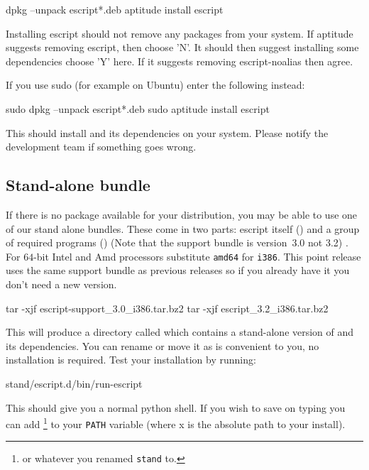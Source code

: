 \begin{shellCode}
dpkg --unpack escript*.deb
aptitude install escript
\end{shellCode}

Installing escript should not remove any packages from your system.
If aptitude suggests removing escript, then choose 'N'.
It should then suggest installing some dependencies choose 'Y' here.
If it suggests removing escript-noalias then agree.

If you use sudo (for example on Ubuntu) enter the following instead:
\begin{shellCode}
sudo dpkg --unpack escript*.deb
sudo aptitude install escript
\end{shellCode}

This should install \esfinley and its dependencies on your system.
Please notify the development team if something goes wrong.

\subsection{Stand-alone bundle}\label{sec:standalonelinux}

If there is no package available for your distribution, you may be able to use one of our stand alone bundles.
These come in two parts: escript itself () and a group of required programs () (Note that the support bundle is version~3.0 not 3.2) . For $64$-bit Intel and Amd processors substitute \texttt{amd64} for \texttt{i386}.
This point release uses the same support bundle as previous releases so if you already have it you don't need a new version.
\begin{shellCode}
tar -xjf escript-support_3.0_i386.tar.bz2
tar -xjf escript_3.2_i386.tar.bz2
\end{shellCode}
This will produce a directory called  which contains a stand-alone version of \esfinley and its dependencies.
You can rename or move it as is convenient to you, no installation is required.
Test your installation by running:
\begin{shellCode}
stand/escript.d/bin/run-escript
\end{shellCode}
This should give you a normal python shell.
If you wish to save on typing you can add \footnote{or whatever you renamed \texttt{stand} to.} to your \texttt{PATH} variable (where x is the absolute path to your install).


